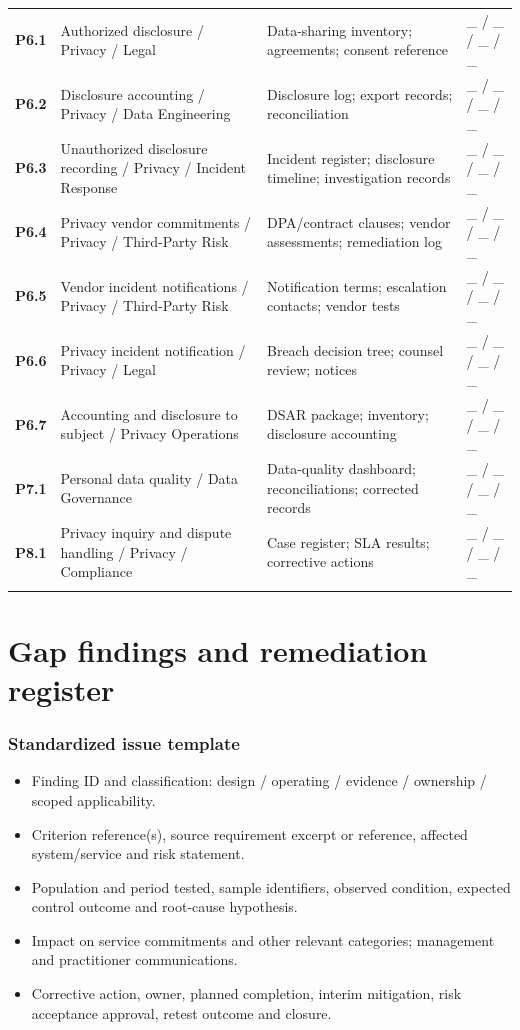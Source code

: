 \documentclass[10pt,oneside]{report}
\begin{document}
\begin{longtable}{@{}p{0.63in}p{2.13in}p{2.28in}p{0.92in}@{}}
\addlinespace[3pt]
\textbf{P6.1} & Authorized disclosure / Privacy / Legal & Data-sharing inventory; agreements; consent reference & \_ / \_ / \_ / \_ \\
\addlinespace[3pt]
\textbf{P6.2} & Disclosure accounting / Privacy / Data Engineering & Disclosure log; export records; reconciliation & \_ / \_ / \_ / \_ \\
\addlinespace[3pt]
\textbf{P6.3} & Unauthorized disclosure recording / Privacy / Incident Response & Incident register; disclosure timeline; investigation records & \_ / \_ / \_ / \_ \\
\addlinespace[3pt]
\textbf{P6.4} & Privacy vendor commitments / Privacy / Third-Party Risk & DPA/contract clauses; vendor assessments; remediation log & \_ / \_ / \_ / \_ \\
\addlinespace[3pt]
\textbf{P6.5} & Vendor incident notifications / Privacy / Third-Party Risk & Notification terms; escalation contacts; vendor tests & \_ / \_ / \_ / \_ \\
\addlinespace[3pt]
\textbf{P6.6} & Privacy incident notification / Privacy / Legal & Breach decision tree; counsel review; notices & \_ / \_ / \_ / \_ \\
\addlinespace[3pt]
\textbf{P6.7} & Accounting and disclosure to subject / Privacy Operations & DSAR package; inventory; disclosure accounting & \_ / \_ / \_ / \_ \\
\addlinespace[3pt]
\textbf{P7.1} & Personal data quality / Data Governance & Data-quality dashboard; reconciliations; corrected records & \_ / \_ / \_ / \_ \\
\addlinespace[3pt]
\textbf{P8.1} & Privacy inquiry and dispute handling / Privacy / Compliance & Case register; SLA results; corrective actions & \_ / \_ / \_ / \_ \\
\addlinespace[3pt]
\bottomrule\end{longtable}\normalsize
\chapter{Gap findings and remediation register}
\subsection{Standardized issue template}
\begin{itemize}
\item Finding ID and classification: design / operating / evidence / ownership / scoped applicability.
\item Criterion reference(s), source requirement excerpt or reference, affected system/service and risk statement.
\item Population and period tested, sample identifiers, observed condition, expected control outcome and root-cause hypothesis.
\item Impact on service commitments and other relevant categories; management and practitioner communications.
\item Corrective action, owner, planned completion, interim mitigation, risk acceptance approval, retest outcome and closure.
\end{itemize}
\end{document}
